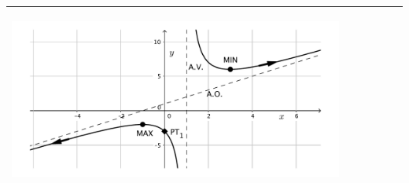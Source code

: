 \begin{center}
\begin{longtable}[h]{|p{}|p{}|p{}|}
{			\begin{center}
				\includegraphics*[width=0.9\textwidth]{img-07/chap-deriv-racional2.pdf}
			\end{center}
		}
		\\  [1.5ex] \hline 
	\end{longtable}
\end{center}
\pagebreak


